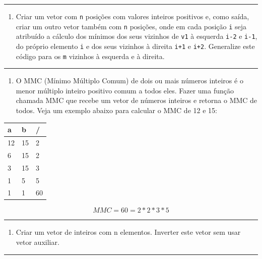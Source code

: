 \documentclass[12pt,a4paper]{article}
\providecommand{\tightlist}{%
      \setlength{\itemsep}{0pt}\setlength{\parskip}{0pt}}
\begin{document}
    \begin{center}\rule{0.5\linewidth}{0.5pt}\end{center}

\begin{enumerate}
\def\labelenumi{\arabic{enumi}.}
\setcounter{enumi}{1}
\tightlist
\item
  Criar um vetor com \texttt{n} posições com valores inteiros positivos
  e, como saída, criar um outro vetor também com \texttt{n} posições,
  onde em cada posição \texttt{i} seja atribuído a cálculo dos mínimos
  dos seus vizinhos de \texttt{v1} à esquerda \texttt{i-2} e
  \texttt{i-1}, do próprio elemento \texttt{i} e dos seus vizinhos à
  direita \texttt{i+1} e \texttt{i+2}. Generalize este código para os
  \texttt{m} vizinhos à esquerda e à direita.
\end{enumerate}

    \begin{center}\rule{0.5\linewidth}{0.5pt}\end{center}

\begin{enumerate}
\def\labelenumi{\arabic{enumi}.}
\setcounter{enumi}{2}
\tightlist
\item
  O MMC (Mínimo Múltiplo Comum) de dois ou mais números inteiros é o
  menor múltiplo inteiro positivo comum a todos eles. Fazer uma função
  chamada MMC que recebe um vetor de números inteiros e retorna o MMC de
  todos. Veja um exemplo abaixo para calcular o MMC de 12 e 15:
\end{enumerate}

    \begin{longtable}[]{@{}lll@{}}
\toprule
a & b & /\tabularnewline
\midrule
\endhead
12 & 15 & 2\tabularnewline
6 & 15 & 2\tabularnewline
3 & 15 & 3\tabularnewline
1 & 5 & 5\tabularnewline
1 & 1 & 60\tabularnewline
\bottomrule
\end{longtable}

\[MMC = 60 = 2*2*3*5\]

    \begin{center}\rule{0.5\linewidth}{0.5pt}\end{center}

\begin{enumerate}
\def\labelenumi{\arabic{enumi}.}
\setcounter{enumi}{3}
\tightlist
\item
  Criar um vetor de inteiros com n elementos. Inverter este vetor sem
  usar vetor auxiliar.
\end{enumerate}

    \begin{center}\rule{0.5\linewidth}{0.5pt}\end{center}
\end{document}

